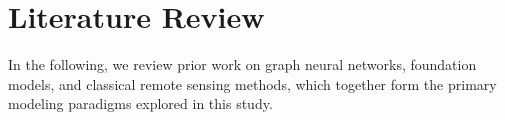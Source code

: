 \documentclass{article}
\theoremstyle{plain}
\theoremstyle{definition}
\theoremstyle{remark}
\begin{document}
\section{Literature Review}
In the following, we review prior work on graph neural networks,
foundation models, and classical remote sensing methods, which together
form the primary modeling paradigms explored in this study.

\end{document}
